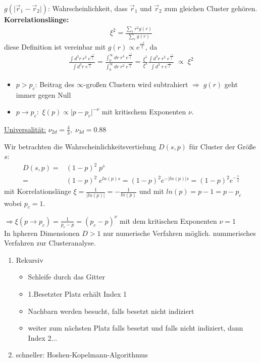 \documentclass[12pt]{article}
\begin{document}
 	 $g( \vert \vec{r}_1 - \vec{r}_2 \vert)$: Wahrscheinlichkeit, dass $\vec{r}_1$ und $\vec{r}_2$ zum gleichen Cluster gehören. \\
 	\textbf{Korrelationslänge:}
 	 \begin{align}
 	\xi^2= \frac{\sum_r r^2 g(r)}{\sum_r g(r)}
 	\end{align}
 	diese Definition ist vereinbar mit $g(r) \propto e^\frac{-r}{\xi}$, da 
 	\begin{align}
 	\frac{\int d^3r \; r^2 \; e^\frac{-r}{\xi}}{\int d^3 r \; e^\frac{-r}{\xi}}
 	= \frac{\int_0^\infty dr \; r^4 \; e^\frac{-r}{\xi}}{\int_0^\infty d r \; r^2 \; e^\frac{-r}{\xi}}
 	= \frac{\xi^5}{\xi^3}  \frac{\int d^3r \; r^2 \; e^\frac{-r}{\xi}}{\int d^3\;  r \; e^\frac{-r}{\xi}} \; \propto \; \xi^2
 	\end{align}
 	\begin{itemize}
 	\item $p>p_c$: Beitrag des $\infty$-großen Clustern wird subtrahiert $\Rightarrow \; g(r)$ geht immer gegen Null
 	\item $p \to p_c:$ $\xi(p) \propto \vert p-p_c \vert^{-\nu}$ mit kritischem Exponenten $\nu$.
 	
 	\end{itemize}

 	\underline{Universalität:} $\nu_{2d}= \frac{4}{3}, \; \nu_{3d}=0.88$
 	
 	 	Wir betrachten die Wahrscheinlichkeitsvertielung $D(s,p)$ für Cluster der Größe $s$: \begin{align}
 	D(s,p)=& (1-p)^2 \; p^s \\
 	=& (1-p)^2 \; e^{ln(p)s} = (1-p)^2 e^{- \vert ln(p) \vert s} = (1-p)^2 e^{-\frac{s}{\xi}}
 	\end{align}
 	mit Korrelationslänge $\xi = \frac{1}{\vert ln(p) \vert} = -\frac{1}{ln(p)}$ und mit $ln(p)= p-1= p-p_c$ wobei $p_c=1$. 
 	
 	$\Rightarrow \xi (p \to p_c) = \frac{1}{p_c-p}= (p_c - p)^\nu $ mit dem kritischen Exponenten $\nu =1$ \\
 	
 	In hpheren Dimensionen $D>1$ nur numerische Verfahren möglich. nummerisches Verfahren zur Clusteranalyse.
 		\begin{enumerate}
 		
 		\item Rekursiv %
 			\begin{itemize}
 			\item Schleife durch das Gitter
 			\item 1.Besetzter Platz erhält Index 1
 			\item Nachbarn werden besucht, falls besetzt nicht indiziert
 			\item weiter zum nächsten Platz falls besetzt und falls nicht indiziert, dann Index 2...
 			\end{itemize}
 			
 		\item schneller: Hoshen-Kopelmann-Algorithmus
 		
\end{enumerate} 	
\end{document}
